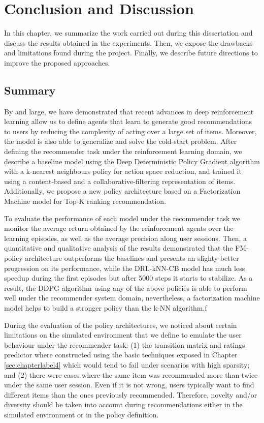 \chapter{Conclusion and Discussion}
\label{chapterlabel4}

In this chapter, we summarize the work carried out during this dissertation and discuss the results obtained in the experiments. Then, we expose the drawbacks and limitations found during the project. Finally, we describe future directions to improve the proposed approaches.

\section{Summary}

By and large, we have demonstrated that recent advances in deep reinforcement learning allow us to define agents that learn to generate good recommendations to users by reducing the complexity of acting over a large set of items. Moreover, the model is also able to generalize and solve the cold-start problem. After defining the recommender task under the reinforcement learning domain, we describe a baseline model using the Deep Deterministic Policy Gradient algorithm with a k-nearest neighbours policy for action space reduction, and trained it using a content-based and a collaborative-filtering representation of items. Additionally, we propose a new policy architecture based on a Factorization Machine model for Top-K ranking recommendation.

To evaluate the performance of each model under the recommender task we monitor the average return obtained by the reinforcement agents over the learning episodes, as well as the average precision along user sessions. Then, a quantitative and qualitative analysis of the results demonstrated that the FM-policy architecture outperforms the baselines and presents an slighty better progression on its performance, while the DRL-kNN-CB model has much less speedup during the first episodes but after 5000 steps it starts to stabilize. As a result, the DDPG algorithm using any of the above policies is able to perform well under the recommender system domain, nevertheless, a factorization machine model helps to build a stronger policy than the k-NN algorithm.f

During the evaluation of the policy architectures, we noticed about certain limitations on the simulated environment that we define to emulate the user behaviour under the recommender task: (1) the transition matrix and ratings predictor where constructed using the basic techniques exposed in Chapter \ref{sec:chapterlabel4} which would tend to fail under scenarios with high sparsity; and (2) there were cases where the same item was recommended more than twice under the same user session. Even if it is not wrong, users typically want to find different items than the ones previously recommended. Therefore, novelty and/or diversity should be taken into account during recommendations either in the simulated environment or in the policy definition.

